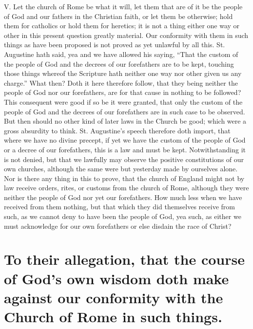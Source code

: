 V. Let the church of Rome be what it will, let them that are of it be the people of God and our fathers in the Christian faith, or let them be otherwise; hold them for catholics or hold them for heretics; it is not a thing either one way or other in this present question greatly material. Our conformity with them in such things as have been proposed is not proved as yet unlawful by all this. St. Augustine hath said, yea and we have allowed his saying, “That the custom of the people of God and the decrees of our forefathers are  to be kept, touching those things whereof the Scripture hath neither one way nor other given us any charge.” What then? Doth it here therefore follow, that they being neither the people of God nor our forefathers, are for that cause in nothing to be followed? This consequent were good if so be it were granted, that only the custom of the people of God and the decrees of our forefathers are in such case to be observed. But then should no other kind of later laws in the Church be good; which were a gross absurdity to think. St. Augustine’s speech therefore doth import, that where we have no divine precept, if yet we have the custom of the people of God or a decree of our forefathers, this is a law and must be kept. Notwithstanding it is not denied, but that we lawfully may observe the positive constitutions of our own churches, although the same were but yesterday made by ourselves alone. Nor is there any thing in this to prove, that the church of England might not by law receive orders, rites, or customs from the church of Rome, although they were neither the people of God nor yet our forefathers. How much less when we have received from them nothing, but that which they did themselves receive from such, as we cannot deny to have been the people of God, yea such, as either we must acknowledge for our own forefathers or else disdain the race of Christ?

\section*{To their allegation, that the course of God’s own wisdom doth make against our conformity with the Church of Rome in such things.}

